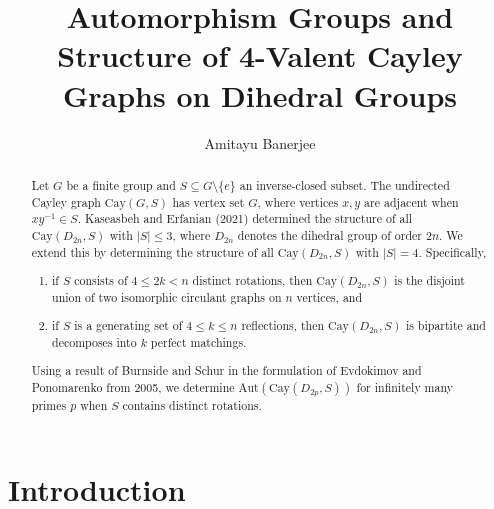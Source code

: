\documentclass[12pt,reqno,a4paper]{amsart}
\title[Cayley Graphs of Dihedral Groups of Valency 4]{Automorphism Groups and Structure of 4-Valent Cayley Graphs on Dihedral Groups}
\author{Amitayu Banerjee}
\date{}
\theoremstyle{definition}
\begin{document}
\begin{abstract}


Let $G$ be a finite group and $S \subseteq G \setminus \{e\}$ an inverse-closed subset.  
The undirected Cayley graph $\mathrm{Cay}(G,S)$ has vertex set $G$, where vertices $x,y$ are adjacent when $xy^{-1}\in S$.
Kaseasbeh and Erfanian (2021) determined the structure of all $\mathrm{Cay}(D_{2n},S)$ with $|S|\le 3$, where $D_{2n}$ denotes the dihedral group of order $2n$.    
We extend this by determining the structure of all $\mathrm{Cay}(D_{2n},S)$ with $|S|=4$.
Specifically, 
\begin{enumerate}
    \item if $S$ consists of $4 \le 2k < n$ distinct rotations, then $\mathrm{Cay}(D_{2n},S)$ is the disjoint union of two isomorphic circulant graphs on $n$ vertices, and
    \item if $S$ is a generating set of $4\leq k\leq n$ reflections, then $\mathrm{Cay}(D_{2n},S)$ is bipartite and decomposes into $k$ perfect matchings. 
\end{enumerate}

Using a result of Burnside and Schur in the formulation of Evdokimov and Ponomarenko from 2005, we determine $\mathrm{Aut}(\mathrm{Cay}(D_{2p},S))$ for infinitely many primes $p$ when $S$ contains distinct rotations.
\end{abstract}
   
\maketitle

\section{Introduction}
\end{document}
